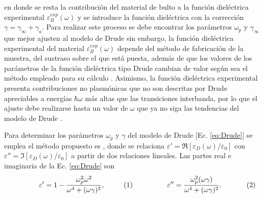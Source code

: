en donde se resta la contribución del material de bulto  a la función dieléctrica experimental $ \varepsilon_B^{exp}(\omega)$ y se introduce la función dieléctrica con la corrección $\gamma = \gamma_\infty+\gamma_a$. Para realizar este proceso se debe encontrar los parámetros $\omega_p$ y $\gamma_\infty$ que mejor ajusten al modelo de Drude sin embargo, la función dieléctrica experimental del material $\varepsilon_B^{exp}(\omega)$ depende del método de fabricación de la muestra, del sustraso sobre el que está puesta, además de que  los valores de los parámetros de la función dieléctrica tipo Drude cambian de valor según sea el método empleado para su cálculo \cite{svetovoy2008optical}.  Asimismo, la función dieléctrica experimental presenta contribuciones no plasmónicas que no son descritas por Drude apreciables a energías $\hbar\omega$ más altas que las transiciones interbanda, por lo que el ajuste debe realizarse hasta un valor de $\omega$ que ya no siga las tendencias del modelo de Drude \cite{mendoza2014determination}.

Para determinar los parámetros $\omega_p$ y $\gamma$ del modelo de Drude [Ec. \eqref{eq:Drude}] se emplea el método propuesto es \cite{mendoza2014determination}, donde se relaciona $\varepsilon' = \Re[\varepsilon_D(\omega)/\varepsilon_0]$ con $\varepsilon''=\Im[\varepsilon_D(\omega)/\varepsilon_0]$ a partir de dos relaciones lineales. Las partes real e imaginaria de la Ec. \eqref{eq:Drude} son \begin{subequations}

	\eqhalf{\varepsilon' =
		 1 - \frac{\omega_p^2 \omega^2}{\omega^4 + (\omega\gamma)^2},
		 \label{eqs:ReDrude}}
	\eqhalf{\varepsilon'' =
		 \frac{\omega_p^2  (\omega\gamma)}{\omega^4 + (\omega\gamma)^2}.
		 \label{eqs:ImDrude}
			}\end{subequations} \noindent

